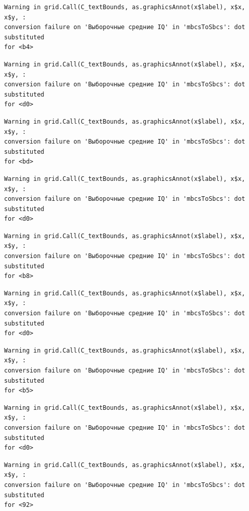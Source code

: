 \documentclass[
  letterpaper,
]{scrbook}
\theoremstyle{definition}
\theoremstyle{remark}
\begin{document}
\begin{verbatim}
Warning in grid.Call(C_textBounds, as.graphicsAnnot(x$label), x$x, x$y, :
conversion failure on 'Выборочные средние IQ' in 'mbcsToSbcs': dot substituted
for <b4>
\end{verbatim}

\begin{verbatim}
Warning in grid.Call(C_textBounds, as.graphicsAnnot(x$label), x$x, x$y, :
conversion failure on 'Выборочные средние IQ' in 'mbcsToSbcs': dot substituted
for <d0>
\end{verbatim}

\begin{verbatim}
Warning in grid.Call(C_textBounds, as.graphicsAnnot(x$label), x$x, x$y, :
conversion failure on 'Выборочные средние IQ' in 'mbcsToSbcs': dot substituted
for <bd>
\end{verbatim}

\begin{verbatim}
Warning in grid.Call(C_textBounds, as.graphicsAnnot(x$label), x$x, x$y, :
conversion failure on 'Выборочные средние IQ' in 'mbcsToSbcs': dot substituted
for <d0>
\end{verbatim}

\begin{verbatim}
Warning in grid.Call(C_textBounds, as.graphicsAnnot(x$label), x$x, x$y, :
conversion failure on 'Выборочные средние IQ' in 'mbcsToSbcs': dot substituted
for <b8>
\end{verbatim}

\begin{verbatim}
Warning in grid.Call(C_textBounds, as.graphicsAnnot(x$label), x$x, x$y, :
conversion failure on 'Выборочные средние IQ' in 'mbcsToSbcs': dot substituted
for <d0>
\end{verbatim}

\begin{verbatim}
Warning in grid.Call(C_textBounds, as.graphicsAnnot(x$label), x$x, x$y, :
conversion failure on 'Выборочные средние IQ' in 'mbcsToSbcs': dot substituted
for <b5>
\end{verbatim}

\begin{verbatim}
Warning in grid.Call(C_textBounds, as.graphicsAnnot(x$label), x$x, x$y, :
conversion failure on 'Выборочные средние IQ' in 'mbcsToSbcs': dot substituted
for <d0>
\end{verbatim}

\begin{verbatim}
Warning in grid.Call(C_textBounds, as.graphicsAnnot(x$label), x$x, x$y, :
conversion failure on 'Выборочные средние IQ' in 'mbcsToSbcs': dot substituted
for <92>
\end{verbatim}
\end{document}
